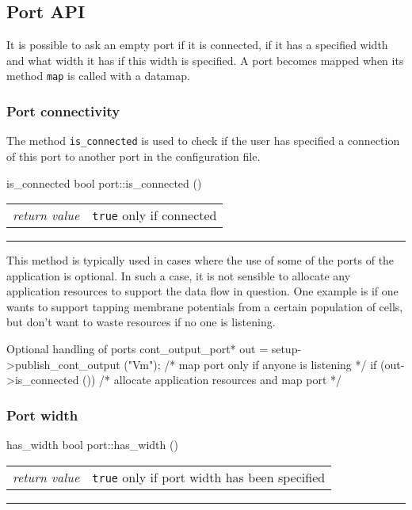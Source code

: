 \documentclass[a4paper]{report}
\makeatletter
\newenvironment{parameters}%
{\begin{tabular}{@{\hspace{2em}}lp{0.6\textwidth}}}%
{\end{tabular}\par\vspace{1mm}\par\hrule\par\vspace{5mm}}
\makeatother
\begin{document}
\subsection{Port API}

It is possible to ask an empty port if it is connected, if it has a
specified width and what width it has if this width is specified.  A
port becomes mapped when its method \lstinline|map| is called with a
datamap.

\subsubsection{Port connectivity}

The method \lstinline|is_connected| is used to check if the user has
specified a connection of this port to another port in the
configuration file.

\begin{head}{is_connected}
  bool port::is_connected ()
\end{head}
\begin{parameters}
  \emph{return value} & \lstinline|true| only if connected\\
\end{parameters}

This method is typically used in cases where the use of some of the
ports of the application is optional.  In such a case, it is not
sensible to allocate any application resources to support the data
flow in question.  One example is if one wants to support tapping
membrane potentials from a certain population of cells, but don't want
to waste resources if no one is listening.

\begin{code}{Optional handling of ports}
  cont_output_port* out = setup->publish_cont_output ("Vm");
  /* map port only if anyone is listening */
  if (out->is_connected ())
    /* allocate application resources and map port */
\end{code}

\subsubsection{Port width}

\begin{head}{has_width}
  bool port::has_width ()
\end{head}
\begin{parameters}
  \emph{return value} & \lstinline|true| only if port width has been
                         specified \\
\end{parameters}
\end{document}
